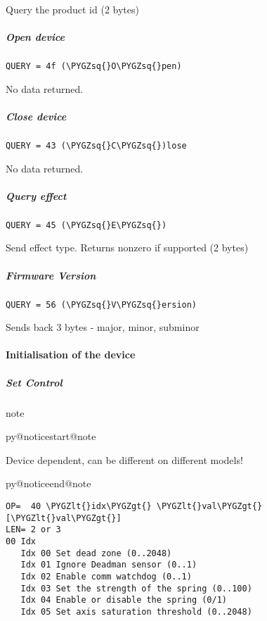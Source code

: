 \documentclass[a4paper,8pt,english]{sphinxmanual}
\makeatletter
\renewenvironment{notice}[2]{%
          \def\py@noticetype{#1}
          \begin{coloredbox}{#1}
          \bf\it
          \par\strong{#2}
          \csname py@noticestart@#1\endcsname
        }
	{
          \csname py@noticeend@\py@noticetype\endcsname
          \end{coloredbox}
        }
\def\PYGZlt{\char`\<}
\def\PYGZgt{\char`\>}
\def\PYGZsq{\char`\'}
\renewcommand\PYGZsq{\textquotesingle}
\makeatother
\begin{document}
Query the product id (2 bytes)


\subparagraph{Open device}
\label{input/devices/iforce-protocol:open-device}
\begin{Verbatim}[commandchars=\\\{\}]
QUERY = 4f (\PYGZsq{}O\PYGZsq{}pen)
\end{Verbatim}

No data returned.


\subparagraph{Close device}
\label{input/devices/iforce-protocol:close-device}
\begin{Verbatim}[commandchars=\\\{\}]
QUERY = 43 (\PYGZsq{}C\PYGZsq{})lose
\end{Verbatim}

No data returned.


\subparagraph{Query effect}
\label{input/devices/iforce-protocol:query-effect}
\begin{Verbatim}[commandchars=\\\{\}]
QUERY = 45 (\PYGZsq{}E\PYGZsq{})
\end{Verbatim}

Send effect type.
Returns nonzero if supported (2 bytes)


\subparagraph{Firmware Version}
\label{input/devices/iforce-protocol:firmware-version}
\begin{Verbatim}[commandchars=\\\{\}]
QUERY = 56 (\PYGZsq{}V\PYGZsq{}ersion)
\end{Verbatim}

Sends back 3 bytes - major, minor, subminor


\paragraph{Initialisation of the device}
\label{input/devices/iforce-protocol:initialisation-of-the-device}

\subparagraph{Set Control}
\label{input/devices/iforce-protocol:set-control}
\begin{notice}{note}{Note:}
Device dependent, can be different on different models!
\end{notice}

\begin{Verbatim}[commandchars=\\\{\}]
OP=  40 \PYGZlt{}idx\PYGZgt{} \PYGZlt{}val\PYGZgt{} [\PYGZlt{}val\PYGZgt{}]
LEN= 2 or 3
00 Idx
   Idx 00 Set dead zone (0..2048)
   Idx 01 Ignore Deadman sensor (0..1)
   Idx 02 Enable comm watchdog (0..1)
   Idx 03 Set the strength of the spring (0..100)
   Idx 04 Enable or disable the spring (0/1)
   Idx 05 Set axis saturation threshold (0..2048)
\end{Verbatim}
\end{document}
